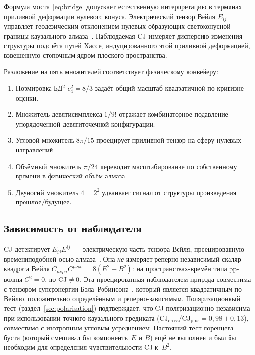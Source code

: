 \documentclass[12pt,a4paper]{article}
\theoremstyle{plain}
\theoremstyle{definition}
\theoremstyle{remark}
\newcommand{\Esq}{E_{ij}E^{ij}}
\newcommand{\CJ}{\mathrm{CJ}}
\begin{document}
Формула моста~\eqref{eq:bridge} допускает естественную
интерпретацию в терминах приливной деформации нулевого
конуса.  Электрический тензор Вейля $E_{ij}$ управляет
геодезическим отклонением нулевых образующих
светоконусной границы каузального
алмаза~\cite{Poisson:2011}.  Наблюдаемая CJ измеряет
дисперсию изменения структуры подсчёта путей Хассе,
индуцированного этой приливной деформацией, взвешенную
стопочным ядром плоского пространства.

Разложение на пять множителей соответствует физическому
конвейеру:
\begin{enumerate}
\item Нормировка БД${}^2$ $c_4^2 = 8/3$ задаёт общий
  масштаб квадратичной по кривизне оценки.
\item Множитель девятисимплекса $1/9!$ отражает
  комбинаторное подавление упорядоченной
  девятиточечной конфигурации.
\item Угловой множитель $8\pi/15$ проецирует приливной
  тензор на сферу нулевых направлений.
\item Объёмный множитель $\pi/24$ переводит масштабирование
  по собственному времени в физический объём алмаза.
\item Двуногий множитель $4 = 2^2$ удваивает сигнал от
  структуры произведения прошлое/будущее.
\end{enumerate}

\subsection{Зависимость от наблюдателя}

CJ детектирует $\Esq$~--- электрическую часть тензора
Вейля, проецированную времениподобной осью
алмаза~\cite{Ehlers:1961,PenroseRindler:1984}.  Она
\emph{не} измеряет реперно-независимый скаляр квадрата
Вейля
$C_{\mu\nu\rho\sigma}C^{\mu\nu\rho\sigma} = 8(E^2 - B^2)$:
на пространствах-времён типа pp-волны $C^2 = 0$, но
$\CJ \neq 0$.  Эта проецированная наблюдателем природа
совместима с тензором суперэнергии
Бэла--Робинсона~\cite{Senovilla:2000}, который является
квадратичным по Вейлю, положительно определённым и
реперно-зависимым.  Поляризационный тест
(раздел~\ref{sec:polarisation}) подтверждает, что CJ
поляризационно-независима при использовании точного
каузального предиката
($\CJ_{\mathrm{cross}}/\CJ_{\mathrm{plus}}
= 0{,}98 \pm 0{,}13$), совместимо с изотропным угловым
усреднением.  Настоящий тест лоренцева буста (который
смешивал бы компоненты $E$ и $B$) ещё не выполнен и был бы
необходим для определения чувствительности CJ к~$B^2$.
\end{document}
